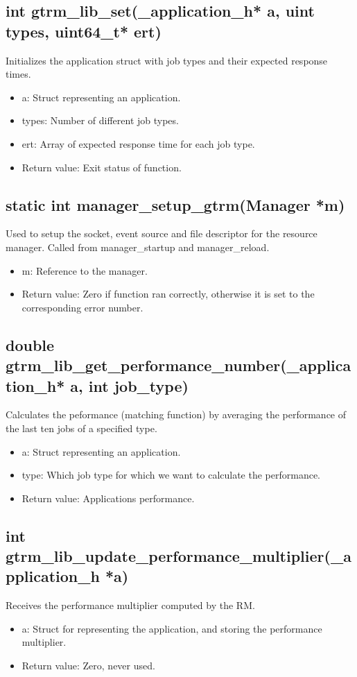 \documentclass[nobiblatex]{LTHthesis}
\begin{document}
\subsection{int gtrm\_lib\_set(\_application\_h* a, uint types, uint64\_t* ert)}
Initializes the application struct with job types and their expected response times.
\begin{itemize}
\item a: Struct representing an application.
\item types: Number of different job types.
\item ert: Array of expected response time for each job type.
\item Return value: Exit status of function.
\end{itemize}

\subsection{static int manager\_setup\_gtrm(Manager *m)}
Used to setup the socket, event source and file descriptor for the resource manager. Called from manager\_startup and manager\_reload.
\begin{itemize}
\item m: Reference to the manager.
\item Return value: Zero if function ran correctly, otherwise it is set to the corresponding error number.
\end{itemize}

\subsection{double gtrm\_lib\_get\_performance\_number(\_application\_h* a, int job\_type)}
Calculates the peformance (matching function) by averaging the performance of the last ten jobs of a specified type.
\begin{itemize}
\item a: Struct representing an application.
\item type: Which job type for which we want to calculate the performance.
\item Return value: Applications performance.
\end{itemize}

\subsection{int gtrm\_lib\_update\_performance\_multiplier(\_application\_h *a)}
Receives the performance multiplier computed by the RM.
\begin{itemize}
\item a: Struct for representing the application, and storing the performance multiplier.
\item Return value: Zero, never used.
\end{itemize}
\end{document}
